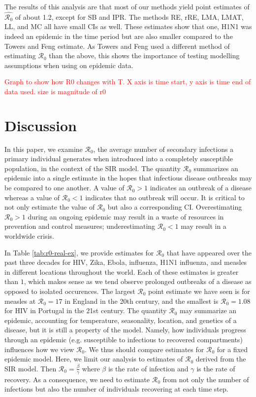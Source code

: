 \documentclass[12pt]{article}
\newcommand{\com}[1]{\textcolor{red}{ #1}}
\newcommand{\rr}{\ensuremath{\mathcal{R}_0}}
\begin{document}
The results of this analysis are that most of our methods yield point estimates of $\hat{\rr}$ of about 1.2, except for SB and IPR.  The methods RE, rRE, LMA, LMAT, LL, and MC all have small CIs as well.  These estimates show that one, H1N1 was indeed an epidemic in the time period but are also smaller compared to the Towers and Feng estimate.  As Towers and Feng used a different method of estimating $\rr$ than the above, this shows the importance of testing modelling assumptions when using on epidemic data.

\com{Graph to show how R0 changes with T.  X axis is time start, y axis is time end of data used.  size is magnitude of r0}

      
\section{Discussion}\label{sec:discussion}



In this paper, we examine $\rr$, the average number of secondary infections a primary individual generates when introduced into a completely susceptible population, in the context of the SIR model.  The quantity $\rr$ summarizes an epidemic into a single estimate in the hopes that infectious disease outbreaks may be compared to one another.  A value of $\rr > 1$ indicates an outbreak of a disease whereas a value of $\rr < 1$ indicates that no outbreak will occur.  It is critical to not only estimate the value of $\rr$ but also a corresponding CI.  Overestimating $\rr > 1$ during an ongoing epidemic may result in a waste of resources in prevention and control measures; underestimating $\rr < 1$ may result in a worldwide crisis.

In Table \ref{tab:r0-real-ex}, we provide estimates for $\rr$ that have appeared over the past three decades for HIV, Zika, Ebola, influenza, H1N1 influenza, and measles in different locations throughout the world.  Each of these estimates is greater than $1$, which makes sense as we tend observe prolonged outbreaks of a disease as opposed to isolated occurences.  The largest $\rr$ point estimate we have seen is for measles at $\rr=17$ in England in the 20th century, and the smallest is $\rr=1.08$ for HIV in Portugal in the 21st century.
The quantity $\rr$ may summarize an epidemic, accounting for temperature, seasonality, location, and genetics of a disease, but it is still a property of the model.  Namely, how individuals progress through an epidemic (e.g. susceptible to infectious to recovered compartments) influences how we view $\rr$.  We thus should compare estimates for $\rr$ for a fixed epidemic model.  Here, we limit our analysis to estimates of $\rr$ derived from the SIR model.  Then $\rr = \frac{\beta}{\gamma}$ where $\beta$ is the rate of infection and $\gamma$ is the rate of recovery.  As a consequence, we need to estimate $\rr$ from not only the number of infections but also the number of individuals recovering at each time step.
\end{document}
